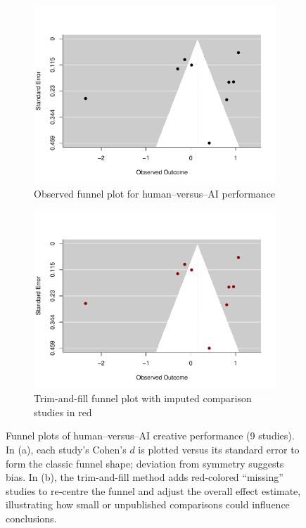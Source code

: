 \documentclass[acmsmall,authorversion]{acmart}
\begin{document}
\begin{figure}[H]
  \centering
  \begin{subfigure}[b]{0.49\linewidth}
    \centering
    \includegraphics[width=\linewidth]{plot_versus_funnel_observed}
    \caption{Observed funnel plot for human–versus–AI performance}
  \end{subfigure}%
  \begin{subfigure}[b]{0.49\linewidth}
    \centering
    \includegraphics[width=\linewidth]{plot_versus_funnel_trimfill}
    \caption{Trim-and-fill funnel plot with imputed comparison studies in red}
  \end{subfigure}
  \caption{Funnel plots of human–versus–AI creative performance (9 studies). In (a), each study’s Cohen’s $d$ is plotted versus its standard error to form the classic funnel shape; deviation from symmetry suggests bias. In (b), the trim-and-fill method adds red‐colored “missing” studies to re‐centre the funnel and adjust the overall effect estimate, illustrating how small or unpublished comparisons could influence conclusions.}
  \label{fig:versus_funnels}
\end{figure}
\end{document}
